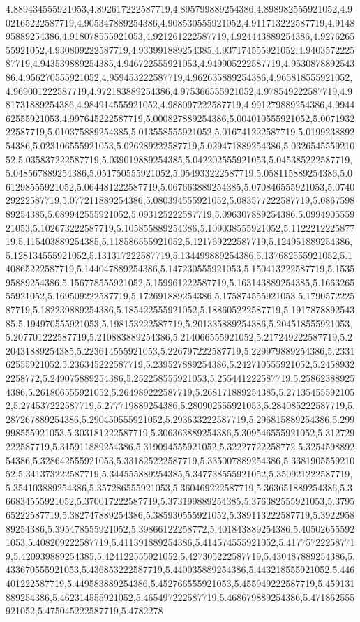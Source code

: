 4.889434555921053,4.892617222587719,4.895799889254386,4.898982555921052,4.902165222587719,4.905347889254386,4.908530555921052,4.911713222587719,4.914895889254386,4.918078555921053,4.921261222587719,4.924443889254386,4.927626555921052,4.930809222587719,4.933991889254385,4.937174555921052,4.940357222587719,4.943539889254385,4.946722555921053,4.949905222587719,4.953087889254386,4.956270555921052,4.959453222587719,4.962635889254386,4.965818555921052,4.969001222587719,4.972183889254386,4.975366555921052,4.978549222587719,4.981731889254386,4.984914555921052,4.988097222587719,4.991279889254386,4.994462555921053,4.997645222587719,5.000827889254386,5.004010555921052,5.007193222587719,5.010375889254385,5.013558555921052,5.016741222587719,5.019923889254386,5.023106555921053,5.026289222587719,5.029471889254386,5.032654555921052,5.035837222587719,5.039019889254385,5.042202555921053,5.045385222587719,5.048567889254386,5.051750555921052,5.054933222587719,5.058115889254386,5.061298555921052,5.064481222587719,5.067663889254385,5.070846555921053,5.074029222587719,5.077211889254386,5.080394555921052,5.083577222587719,5.086759889254385,5.089942555921052,5.093125222587719,5.096307889254386,5.099490555921053,5.102673222587719,5.105855889254386,5.109038555921052,5.112221222587719,5.115403889254385,5.118586555921052,5.121769222587719,5.124951889254386,5.128134555921052,5.131317222587719,5.134499889254386,5.137682555921052,5.140865222587719,5.144047889254386,5.147230555921053,5.150413222587719,5.153595889254386,5.156778555921052,5.159961222587719,5.163143889254385,5.166326555921052,5.169509222587719,5.172691889254386,5.175874555921053,5.179057222587719,5.182239889254386,5.185422555921052,5.188605222587719,5.191787889254385,5.194970555921053,5.198153222587719,5.201335889254386,5.204518555921053,5.207701222587719,5.210883889254386,5.214066555921052,5.217249222587719,5.220431889254385,5.223614555921053,5.226797222587719,5.229979889254386,5.233162555921052,5.236345222587719,5.239527889254386,5.242710555921052,5.24589322258772,5.249075889254386,5.252258555921053,5.255441222587719,5.258623889254386,5.261806555921052,5.264989222587719,5.268171889254385,5.271354555921052,5.274537222587719,5.277719889254386,5.280902555921053,5.284085222587719,5.287267889254386,5.290450555921052,5.293633222587719,5.296815889254386,5.299998555921053,5.303181222587719,5.306363889254386,5.309546555921052,5.312729222587719,5.315911889254386,5.319094555921052,5.32227722258772,5.325459889254386,5.328642555921053,5.331825222587719,5.335007889254386,5.338190555921052,5.341373222587719,5.344555889254385,5.347738555921052,5.350921222587719,5.354103889254386,5.357286555921053,5.360469222587719,5.363651889254386,5.366834555921052,5.370017222587719,5.373199889254385,5.376382555921053,5.379565222587719,5.382747889254386,5.385930555921052,5.389113222587719,5.392295889254386,5.395478555921052,5.39866122258772,5.401843889254386,5.405026555921053,5.408209222587719,5.411391889254386,5.414574555921052,5.417757222587719,5.420939889254385,5.424122555921052,5.427305222587719,5.430487889254386,5.433670555921053,5.436853222587719,5.440035889254386,5.443218555921052,5.446401222587719,5.449583889254386,5.452766555921053,5.455949222587719,5.459131889254386,5.462314555921052,5.465497222587719,5.468679889254386,5.471862555921052,5.475045222587719,5.4782278